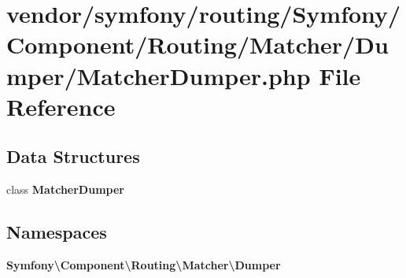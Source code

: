 \section{vendor/symfony/routing/\+Symfony/\+Component/\+Routing/\+Matcher/\+Dumper/\+Matcher\+Dumper.php File Reference}
\label{_matcher_dumper_8php}
\subsection*{Data Structures}
\begin{DoxyCompactItemize}
\item 
class {\bf Matcher\+Dumper}
\end{DoxyCompactItemize}
\subsection*{Namespaces}
\begin{DoxyCompactItemize}
\item 
 {\bf Symfony\textbackslash{}\+Component\textbackslash{}\+Routing\textbackslash{}\+Matcher\textbackslash{}\+Dumper}
\end{DoxyCompactItemize}
